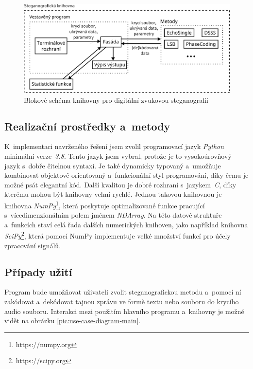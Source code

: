 \begin{figure}[hbt]
    \centering
    \includegraphics[width=\textwidth]{obrazky/block-diagram.pdf}
    \caption{Blokové schéma knihovny pro digitální zvukovou steganografii}
    \label{pic:library-block-diagram}
\end{figure}

\subsection*{Realizační prostředky a~metody}
\label{sub:solution-tool-choices}

K~implementaci navrženého řešení jsem zvolil programovací jazyk \textit{Python}
minimální verze~\textit{3.8}. Tento jazyk jsem vybral, protože je to
vysokoúrovňový jazyk s~dobře čitelnou syntaxí. Je také dynamicky typovaný
a~umožňuje kombinovat objektově orientovaný a~funkcionální styl programování,
díky čemu je možné psát elegantní kód. Další kvalitou je dobré rozhraní
s~jazykem~\textit{C}, díky kterému mohou být knihovny velmi rychlé. Jednou
takovou knihovnou je knihovna \textit{NumPy}\footnote{https://numpy.org}, která
poskytuje optimalizované funkce pracující s~vícedimenzionálním polem jménem
\textit{NDArray}. Na této datové struktuře a~funkcích staví celá řada dalších
numerických knihoven, jako například knihovna
\textit{SciPy}\footnote{https://scipy.org}, která pomocí NumPy implementuje
velké množství funkcí pro účely zpracování signálů.

\blindtext

\subsection*{Případy užití}
\label{sub:use-cases}

Program bude umožňovat uživateli zvolit steganografickou metodu a~pomocí ní
zakódovat a~dekódovat tajnou zprávu ve formě textu nebo souboru do krycího
audio souboru. Interakci mezi použitím hlavního programu a~knihovny je možné
vidět na obrázku \ref{pic:use-case-diagram-main}.

